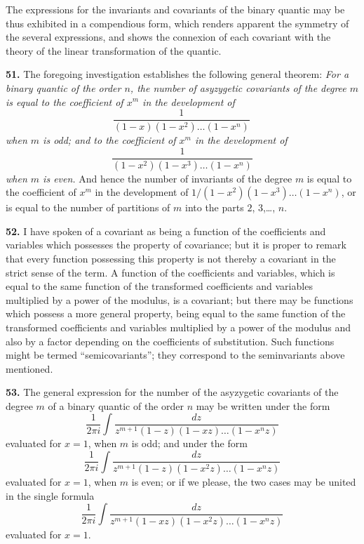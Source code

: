 \documentclass[11pt,a4paper]{book}
\begin{document}
The expressions for the invariants and covariants of the binary quantic may be thus exhibited in a compendious form, which renders apparent the symmetry of the several expressions, and shows the connexion of each covariant with the theory of the linear transformation of the quantic.

\clearpage
\setcounter{page}{269}

\textbf{51.} The foregoing investigation establishes the following general theorem: \textit{For a binary quantic of the order $n$, the number of asyzygetic covariants of the degree $m$ is equal to the coefficient of $x^{m}$ in the development of}
\[
\frac{1}{(1-x)(1-x^{2})\ldots(1-x^{n})}\,
\]
\textit{when $m$ is odd; and to the coefficient of $x^{m}$ in the development of}
\[
\frac{1}{(1-x^{2})(1-x^{3})\ldots(1-x^{n})}
\]
\textit{when $m$ is even.} And hence the number of invariants of the degree $m$ is equal to the coefficient of $x^{m}$ in the development of $1/(1-x^{2})(1-x^{3})\ldots(1-x^{n})$, or is equal to the number of partitions of $m$ into the parts $2$, $3$,\ldots, $n$.

\textbf{52.} I have spoken of a covariant as being a function of the coefficients and variables which possesses the property of covariance; but it is proper to remark that every function possessing this property is not thereby a covariant in the strict sense of the term. A function of the coefficients and variables, which is equal to the same function of the transformed coefficients and variables multiplied by a power of the modulus, is a covariant; but there may be functions which possess a more general property, being equal to the same function of the transformed coefficients and variables multiplied by a power of the modulus and also by a factor depending on the coefficients of substitution. Such functions might be termed ``semicovariants''; they correspond to the seminvariants above mentioned.

\textbf{53.} The general expression for the number of the asyzygetic covariants of the degree $m$ of a binary quantic of the order $n$ may be written under the form
\[
\frac{1}{2\pi i}\int \frac{dz}{z^{m+1}(1-z)(1-xz)\ldots(1-x^{n}z)}
\]
evaluated for $x=1$, when $m$ is odd; and under the form
\[
\frac{1}{2\pi i}\int \frac{dz}{z^{m+1}(1-z)(1-x^{2}z)\ldots(1-x^{n}z)}
\]
evaluated for $x=1$, when $m$ is even; or if we please, the two cases may be united in the single formula
\[
\frac{1}{2\pi i}\int \frac{dz}{z^{m+1}(1-xz)(1-x^{2}z)\ldots(1-x^{n}z)}
\]
evaluated for $x=1$.
\end{document}
